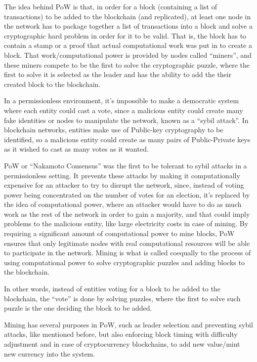 The idea behind PoW is that, in order for a block (containing a list of transactions) to be added to the blockchain (and replicated), at least one node in the network has to package together a list of transactions into a block and solve a cryptographic hard problem in order for it to be valid.
That is, the block has to contain a stamp or a proof that actual computational work was put in to create a block.
That work/computational power is provided by nodes called ``miners'', and these miners compete to be the first to solve the cryptographic puzzle, where the first to solve it is selected as the leader and has the ability to add the their created block to the blockchain.

In a permissionless environment, it's impossible to make a democratic system where each entity could cast a vote, since a malicious entity could create many fake identities or nodes to manipulate the network, known as a ``sybil attack''.
In blockchain networks, entities make use of Public-key cryptography to be identified, so a malicious entity could create as many pairs of Public-Private keys as it wished to cast as many votes as it wanted.

PoW or ``Nakamoto Consensus'' was the first to be tolerant to sybil attacks in a permissionless setting.
It prevents these attacks by making it computationally expensive for an attacker to try to disrupt the network, since, instead of voting power being concentrated on the number of votes for an election, it's replaced by the idea of computational power, where an attacker would have to do as much work as the rest of the network in order to gain a majority, and that could imply problems to the malicious entity, like large electricity costs in case of mining.
By requiring a significant amount of computational power to mine blocks, PoW ensures that only legitimate nodes with real computational resources will be able to participate in the network.
Mining is what is called coequally to the process of using computational power to solve cryptographic puzzles and adding blocks to the blockchain.

In other words, instead of entities voting for a block to be added to the blockchain, the ``vote'' is done by solving puzzles, where the first to solve such puzzle is the one deciding the block to be added.

Mining has several purposes in PoW, such as leader selection and preventing sybil attacks, like mentioned before, but also enforcing block timing with difficulty adjustment and in case of cryptocurrency blockchains, to add new value/mint new currency into the system. 

